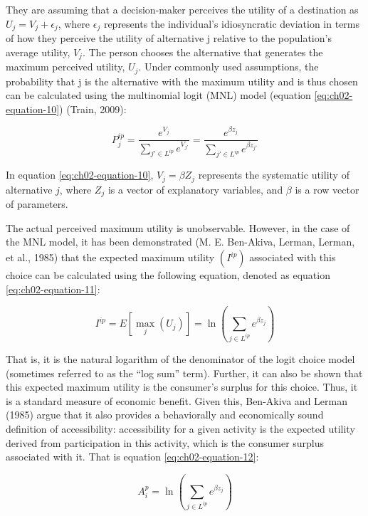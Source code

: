 \documentclass[
11pt, %
oneside, %
english, %
singlespacing, %
]{macthesis} %
\begin{document}
They are assuming that a decision-maker perceives the utility of a destination as \(U_j = V_j + \epsilon_j\), where \(\epsilon_j\) represents the individual's idiosyncratic deviation in terms of how they perceive the utility of alternative j relative to the population's average utility, \(V_j\). The person chooses the alternative that generates the maximum perceived utility, \(U_j\). Under commonly used assumptions, the probability that j is the alternative with the maximum utility and is thus chosen can be calculated using the multinomial logit (MNL) model (equation \ref{eq:ch02-equation-10}) (Train, 2009):

\begin{equation}
P_j^{ip} = \frac{e^{V_j}}{\sum_{j' \in L^{ip}} e^{V_{j'}}} = \frac{e^{\beta z_j}}{\sum_{j' \in L^{ip}} e^{\beta z_{j'}}}
\label{eq:ch02-equation-10}
\end{equation}

In equation \ref{eq:ch02-equation-10}, \({V_j} = \beta{Z_j}\) represents the systematic utility of alternative \(j\), where \({Z_j}\) is a vector of explanatory variables, and \(\beta\) is a row vector of parameters.

The actual perceived maximum utility is unobservable. However, in the case of the MNL model, it has been demonstrated (M. E. Ben-Akiva, Lerman, Lerman, et al., 1985) that the expected maximum utility \((I^{ip})\) associated with this choice can be calculated using the following equation, denoted as equation \ref{eq:ch02-equation-11}:

\begin{equation}
I^{ip} = E\left[ \max_j (U_j) \right] = \ln\left(\sum_{j \in L^{ip}} e^{\beta z_j} \right)
\label{eq:ch02-equation-11}
\end{equation}

That is, it is the natural logarithm of the denominator of the logit choice model (sometimes referred to as the ``log sum'' term). Further, it can also be shown that this expected maximum utility is the consumer's surplus for this choice. Thus, it is a standard measure of economic benefit. Given this, Ben-Akiva and Lerman (1985) argue that it also provides a behaviorally and economically sound definition of accessibility: accessibility for a given activity is the expected utility derived from participation in this activity, which is the consumer surplus associated with it. That is equation \ref{eq:ch02-equation-12}:

\begin{equation}
A^{p}_i = \ln \left(\sum_{j \in L^{ip}} e^{\beta z_j} \right)
\label{eq:ch02-equation-12}
\end{equation}
\end{document}
